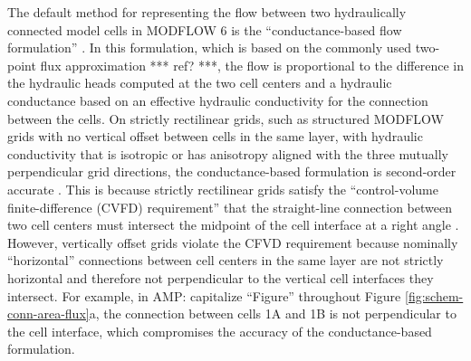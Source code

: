 \documentclass{article}
\begin{document}

The default method for representing the flow between two hydraulically connected model cells in MODFLOW 6 is the ``conductance-based flow formulation'' \citep{modflow6gwf}. In this formulation, which is based on the commonly used two-point flux approximation {\color{red} *** ref? ***}, the flow is proportional to the difference in the hydraulic heads computed at the two cell centers and a hydraulic conductance based on an effective hydraulic conductivity for the connection between the cells. On strictly rectilinear grids, such as structured MODFLOW grids with no vertical offset between cells in the same layer, with hydraulic conductivity that is isotropic or has anisotropy aligned with the three mutually perpendicular grid directions, the conductance-based formulation is second-order accurate \citep{dehotin2010modeling, modflow6gwf}. This is because strictly rectilinear grids satisfy the ``control-volume finite-difference (CVFD) requirement'' that the straight-line connection between two cell centers must intersect the midpoint of the cell interface at a right angle \citep{narasimhan1976integrated}. However, vertically offset grids violate the CFVD requirement because nominally ``horizontal'' connections between cell centers in the same layer are not strictly horizontal and therefore not perpendicular to the vertical cell interfaces they intersect. For example, in {\color{red} AMP: capitalize ``Figure'' throughout} Figure \ref{fig:schem-conn-area-flux}a, the connection between cells 1A and 1B is not perpendicular to the cell interface, which compromises the accuracy of the conductance-based formulation.
\end{document}
